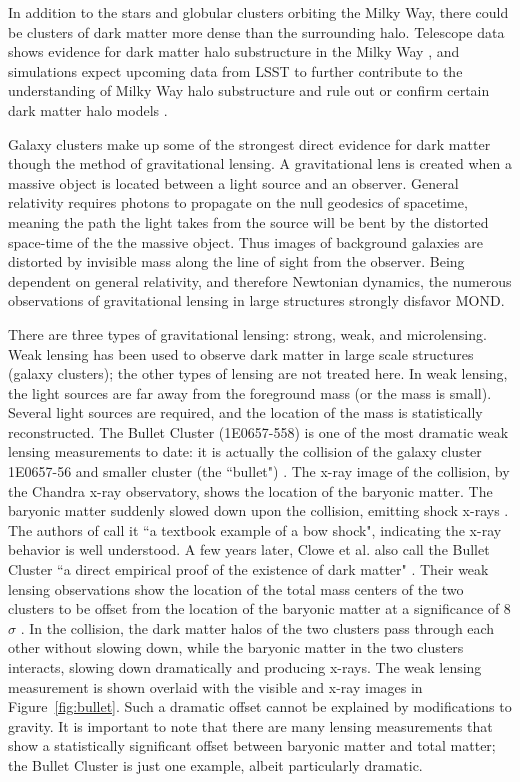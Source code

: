 In addition to the stars and globular clusters orbiting the Milky Way, there could be clusters of dark matter more dense than the surrounding halo. Telescope data shows evidence for dark matter halo substructure in the Milky Way \cite{Erkal2017}, and simulations expect upcoming data from LSST to further contribute to the understanding of Milky Way halo substructure and rule out or confirm certain dark matter halo models \cite{Banik2018}.

Galaxy clusters make up some of the strongest direct evidence for dark matter though the method of gravitational lensing. A gravitational lens is created when a massive object is located between a light source and an observer. General relativity requires photons to propagate on the null geodesics of spacetime, meaning the path the light takes from the source will be bent by the distorted space-time of the the massive object. Thus images of background galaxies are distorted by invisible mass along the line of sight from the observer. Being dependent on general relativity, and therefore Newtonian dynamics, the numerous observations of gravitational lensing in large structures strongly disfavor \ac{MOND}. 

There are three types of gravitational lensing: strong, weak, and microlensing. Weak lensing has been used to observe dark matter in large scale structures (galaxy clusters); the other types of lensing are not treated here. In weak lensing, the light sources are far away from the foreground mass (or the mass is small). Several light sources are required, and the location of the mass is statistically reconstructed. The Bullet Cluster (1E0657-558) is one of the most dramatic weak lensing measurements to date: it is actually the collision of the galaxy cluster 1E0657-56 and smaller cluster (the ``bullet") \cite{Markevitch2001}. The x-ray image of the collision, by the Chandra x-ray observatory, shows the location of the baryonic matter. The baryonic matter suddenly slowed down upon the collision, emitting shock x-rays  \cite{Markevitch2001}. The authors of \cite{Markevitch2001} call it ``a textbook example of a bow shock", indicating the x-ray behavior is well understood. A few years later, Clowe et al. also call the Bullet Cluster ``a direct empirical proof of the existence of dark matter" \cite{Clowe2006}. Their weak lensing observations show the location of the total mass centers of the two clusters to be offset from the location of the baryonic matter at a significance of 8$\sigma$ \cite{Clowe2006}. In the collision, the dark matter halos of the two clusters pass through each other without slowing down, while the baryonic matter in the two clusters interacts, slowing down dramatically and producing x-rays. The weak lensing measurement is shown overlaid with the visible and x-ray images in Figure~\ref{fig:bullet}. Such a dramatic offset cannot be explained by modifications to gravity. It is important to note that there are many lensing measurements that show a statistically significant offset between baryonic matter and total matter; the Bullet Cluster is just one example, albeit particularly dramatic.

